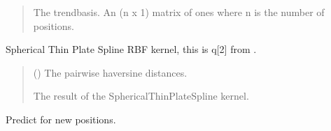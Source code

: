 \documentclass[letterpaper,10pt,english]{sphinxmanual}
\begin{document}
\begin{fulllineitems}
\begin{fulllineitems}
\begin{quote}
\begin{description}
\sphinxAtStartPar
{} \textendash{} The trend\sphinxhyphen{}basis. An (n x 1) matrix of ones where n is the number of
positions.

\sphinxAtStartPar
{}

\end{description}\end{quote}

\end{fulllineitems}


\begin{fulllineitems}
\label{\detokenize{splines:glomar_gridding.spline.SphericalThinPlateSpline.kernel}}
\pysigstartsignatures
\pysiglinewithargsret
{}
{}
{}
\pysigstopsignatures
\sphinxAtStartPar
Spherical Thin Plate Spline RBF kernel, this is q{[}2{]} from
.
\begin{quote}\begin{description}
\sphinxAtStartPar
{} () \textendash{} The pairwise haversine distances.

\sphinxAtStartPar
The result of the SphericalThinPlateSpline kernel.

\sphinxAtStartPar
{}

\end{description}\end{quote}

\end{fulllineitems}


\begin{fulllineitems}
\label{\detokenize{splines:glomar_gridding.spline.SphericalThinPlateSpline.predict}}
\pysigstartsignatures
\pysiglinewithargsret
{}
{\sphinxparamcomma {}\sphinxparamcomma {}}
{}
\pysigstopsignatures
\sphinxAtStartPar
Predict for new positions.


\end{fulllineitems}
\end{fulllineitems}
\end{document}
